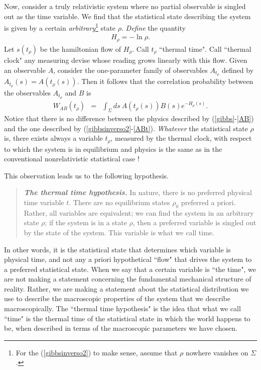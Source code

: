 \documentclass[10pt,nofootinbib]{revtex4}
\begin{document}
Now, consider a truly
relativistic system where no partial observable is singled out as the
time variable.  We find that the statistical state describing the system
is given by a certain \emph{arbitrary}\footnote{For the
(\ref{gibbsinverso2}) to make sense, assume that $\rho$ nowhere
vanishes on $\Sigma$.\label{footn}} state $\rho$.  \emph{Define} the quantity
\begin{eqnarray}
H_{\rho} = - \ln \rho.
\label{gibbsinverso2}
\end{eqnarray}
Let $s(t_{\rho})$ be the hamiltonian flow of $H_{\rho}$.  Call
$t_{\rho}$ ``thermal time".   Call ``thermal
clock" any measuring devise whose reading grows linearly with this
flow.  Given an observable $A$, consider the one-parameter family of
observables $A_{t_{\rho}}$ defined by 
$A_{t_{\rho}}(s)=A(t_{\rho}(s))$.  Then it follows that the
correlation probability between the observables
  $A_{t_{\rho}}$ and $B$
is
\begin{eqnarray}
W_{AB}(t_{\rho})& = & \int_{\Sigma} ds \ A(t_{\rho}(s)) B(s)
e^{-H_{\rho}(s)}.
\label{ABt} 
\end{eqnarray}
Notice that there is no  difference between the physics described by 
(\ref{gibbs}-\ref{AB}) and the one described by
(\ref{gibbsinverso2}-\ref{ABt}).  \emph{Whatever}
the statistical state $\rho$ is, there exists always a variable
$t_{\rho}$, measured by the thermal clock,  with
respect to which the system is in equilibrium and physics is the same
as in the conventional nonrelativistic statistical case !  

This observation leads us to the following hypothesis.
\begin{quote}
{\bf\em The thermal time hypothesis.} 
In nature, there is no preferred physical time variable $t$.  There
are no equilibrium states $\rho_{0}$ preferred a priori.  Rather, all
variables are equivalent; we can find the system in an arbitrary state
$\rho$; if the system is in a state $\rho$, then a preferred variable
is singled out by the state of the system.  This variable is what we
call time.
\end{quote}
In other words, it is the statistical state that determines which
variable is physical time, and not any a priori hypothetical ``flow"
that drives the system to a preferred statistical state. 
When we say that a certain variable is ``the time", we
are not making a statement concerning the fundamental mechanical
structure of reality.  Rather, we are making a statement about the
statistical distribution we use to describe the macroscopic properties
of the system that we describe macroscopically.
The ``thermal time hypothesis" is the idea that
what we call ``time" is the thermal time of the statistical
state in which the world happens to be, when described in terms of the
macroscopic parameters we have chosen.  
\end{document}
